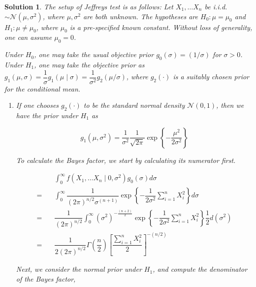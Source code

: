 \documentclass[12pt]{article}
\theoremstyle{problemstyle}
\newtheorem*{solution*}{Solution}
\newcommand{\normal}{\mathcal{N}}
\begin{document}
\begin{solution*}
    The setup of Jeffreys test is as follows: Let $X_1, \dots X_n$ be i.i.d. $\sim \normal(\mu, \sigma^2)$, where $\mu, \sigma^2$ are both unknown. The hypotheses are $H_0: \mu = \mu_0$ and $H_1: \mu \neq \mu_0$, where $\mu_0$ is a pre-specified known constant. Without loss of generality, one can assume $\mu_0 = 0$. 

    Under $H_0$, one may take the usual objective prior $g_0(\sigma) = (1/\sigma)$ for $\sigma > 0$. Under $H_1$, one may take the objective prior as $g_1(\mu, \sigma) = \dfrac{1}{\sigma} g_1(\mu \mid \sigma) = \dfrac{1}{\sigma^2} g_2(\mu/\sigma)$, where $g_2(\cdot)$ is a suitably chosen prior for the conditional mean.

    \begin{enumerate}
        \item[(a)] If one chooses $g_2(\cdot)$ to be the standard normal density $\normal(0, 1)$, then we have the prior under $H_1$ as 
        
        $$
        g_1(\mu, \sigma^2) = \dfrac{1}{\sigma^2} \dfrac{1}{\sqrt{2\pi}} \exp\left\{ -\dfrac{\mu^2}{2 \sigma^2} \right\}
        $$

        To calculate the Bayes factor, we start by calculating its numerator first.

        \begin{align*}
            & \int_{0}^\infty f(X_1, \dots X_n \mid 0, \sigma^2) g_0(\sigma)d\sigma\\
            = \quad & \int_{0}^\infty \dfrac{1}{(2\pi)^{n/2} \sigma^{(n+1)}} \exp\left\{ -\dfrac{1}{2\sigma^2}\sum_{i=1}^n X_i^2 \right\} d\sigma \\
            = \quad & \dfrac{1}{(2\pi)^{n/2}} \int_{0}^\infty (\sigma^2)^{-\frac{(n+2)}{2} } \exp\left\{ -\dfrac{1}{2\sigma^2}\sum_{i=1}^n X_i^2 \right\} \dfrac{1}{2} d(\sigma^2)\\
            = \quad & \dfrac{1}{2(2\pi)^{n/2}} \Gamma\left( \dfrac{n}{2} \right) \left[ \dfrac{\sum_{i=1}^n X_i^2}{2} \right]^{-(n/2)} 
        \end{align*}

        Next, we consider the normal prior under $H_1$, and compute the denominator of the Bayes factor, 


\end{enumerate}
\end{solution*}
\end{document}
